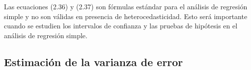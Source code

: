 Las ecuaciones (2.36) y (2.37) son fórmulas estándar para el análisis de regresión simple y no son válidas en presencia de heterocedasticidad. Esto será importante cuando se estudien los intervalos de confianza y las pruebas de hipótesis en el análisis de regresión simple.

\subsection{Estimación de la varianza de error}

